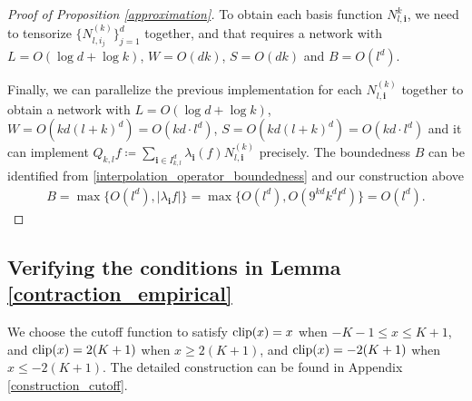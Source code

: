 \documentclass{article}
\newcommand{\clip}{\textnormal{clip}}
\theoremstyle{plain}
\theoremstyle{definition}
\theoremstyle{remark}
\begin{document}
\begin{proof}[Proof of Proposition \ref{approximation}]
    To obtain each basis function $N_{l, \bm{i}}^{k}$, we need to tensorize $\{N_{l, i_j}^{(k)}\}_{j=1}^d$ together, and that requires a network with $L = O(\log d + \log k)$,  $W = O(d k)$, $S = O(dk)$  and $B = O(l^d)$. 

    Finally, we can parallelize the previous implementation for each $N_{l, \bm{i}}^{(k)}$ together to obtain a network with $L = O(\log d + \log k)$, $W = O(kd (l+k)^d) = O(k d \cdot l^d)$, $S = O(kd (l+k)^d) = O(k d \cdot l^d)$ and it can implement $Q_{k, l} f \coloneqq \sum_{\bm{i} \in I_{k, l}^d } \lambda_{\bm{i}}(f) N_{l, \bm{i}}^{(k)}$ precisely. The boundedness $B$ can be identified from \eqref{interpolation_operator_boundedness} and our construction above 
    \begin{align*}
        B = \max\{O(l^d), |\lambda_{\bm{i}} f|\} = \max\{O(l^d), O(9^{kd} k^d l^d)\} = O(l^d). 
    \end{align*}
\end{proof}

\subsection{Verifying the conditions in Lemma \ref{contraction_empirical}} \label{proof_verify_conditions}
We choose the cutoff function to satisfy  $\clip(x) = x$ when $-K - 1\leq x \leq K +1$, and $\clip(x) = 2(K+1)$ when $x \geq 2(K+1)$, and $\clip(x) = -2(K+1)$ when $x \leq -2(K+1)$. The detailed construction can be found in Appendix \ref{construction_cutoff}. 
\end{document}
